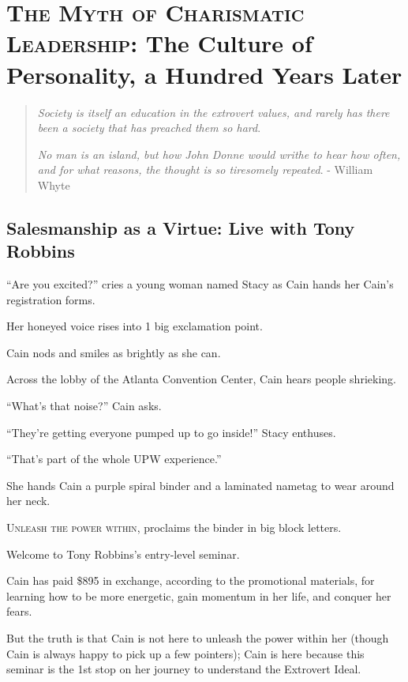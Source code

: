 \documentclass[oneside]{article}
\numberwithin{equation}{section}
\begin{document}

\section{\textsc{The Myth of Charismatic Leadership}: The Culture of Personality, a Hundred Years Later}
\begin{quotation}
    \textit{Society is itself an education in the extrovert values, and rarely has there been a society that has preached them so hard}.
    
    \textit{No man is an island, but how John Donne would writhe to hear how often, and for what reasons, the thought is so tiresomely repeated}. - William Whyte
\end{quotation}

\subsection{Salesmanship as a Virtue: Live with Tony Robbins}
``Are you excited?'' cries a young woman named Stacy as Cain hands her Cain's registration forms.

Her honeyed voice rises into 1 big exclamation point.

Cain nods and smiles as brightly as she can.

Across the lobby of the Atlanta Convention Center, Cain hears people shrieking.

%
``What's that noise?'' Cain asks.

%
``They're getting everyone pumped up to go inside!'' Stacy enthuses.

``That's part of the whole UPW experience.''

She hands Cain a purple spiral binder and a laminated nametag to wear around her neck.

\textsc{Unleash the power within}, proclaims the binder in big block letters.

Welcome to Tony Robbins's entry-level seminar.

%
Cain has paid \$895 in exchange, according to the promotional materials, for learning how to be more energetic, gain momentum in her life, and conquer her fears.

But the truth is that Cain is not here to unleash the power within her (though Cain is always happy to pick up a few pointers); Cain is here because this seminar is the 1st stop on her journey to understand the Extrovert Ideal.
\end{document}
